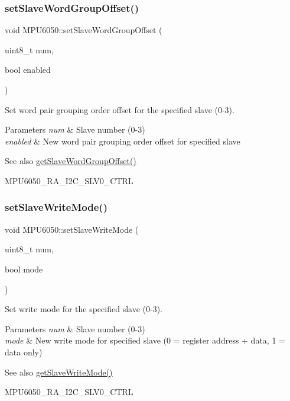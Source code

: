 \subsubsection{\texorpdfstring{setSlaveWordGroupOffset()}{setSlaveWordGroupOffset()}}
{\footnotesize\ttfamily void M\+P\+U6050\+::set\+Slave\+Word\+Group\+Offset (\begin{DoxyParamCaption}\item[{uint8\+\_\+t}]{num,  }\item[{bool}]{enabled }\end{DoxyParamCaption})}

Set word pair grouping order offset for the specified slave (0-\/3). 
\begin{DoxyParams}{Parameters}
{\em num} & Slave number (0-\/3) \\
\hline
{\em enabled} & New word pair grouping order offset for specified slave \\
\hline
\end{DoxyParams}
\begin{DoxySeeAlso}{See also}
\mbox{\hyperlink{class_m_p_u6050_a32ce8023bb80afc5d55811de70c7214f}{get\+Slave\+Word\+Group\+Offset()}} 

M\+P\+U6050\+\_\+\+R\+A\+\_\+\+I2\+C\+\_\+\+S\+L\+V0\+\_\+\+C\+T\+RL 
\end{DoxySeeAlso}
\mbox{\label{class_m_p_u6050_a3d9bfcb5394c7a382009cd2dc91ce801}} 
\subsubsection{\texorpdfstring{setSlaveWriteMode()}{setSlaveWriteMode()}}
{\footnotesize\ttfamily void M\+P\+U6050\+::set\+Slave\+Write\+Mode (\begin{DoxyParamCaption}\item[{uint8\+\_\+t}]{num,  }\item[{bool}]{mode }\end{DoxyParamCaption})}

Set write mode for the specified slave (0-\/3). 
\begin{DoxyParams}{Parameters}
{\em num} & Slave number (0-\/3) \\
\hline
{\em mode} & New write mode for specified slave (0 = register address + data, 1 = data only) \\
\hline
\end{DoxyParams}
\begin{DoxySeeAlso}{See also}
\mbox{\hyperlink{class_m_p_u6050_adb99955fa66300b1f0bedfcdd8187412}{get\+Slave\+Write\+Mode()}} 

M\+P\+U6050\+\_\+\+R\+A\+\_\+\+I2\+C\+\_\+\+S\+L\+V0\+\_\+\+C\+T\+RL 
\end{DoxySeeAlso}
\mbox{\label{class_m_p_u6050_a15ec5f8e7daf235f507c1d8b96af051a}} 

